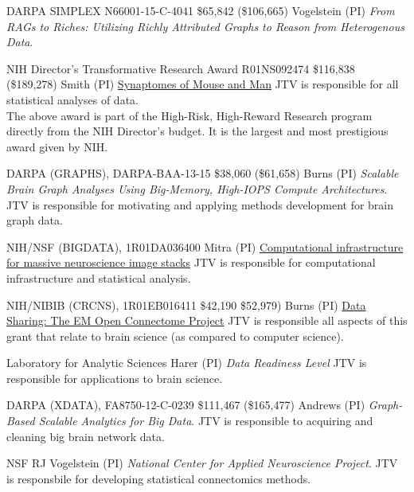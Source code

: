 \documentclass[10pt,colorlinks=true,urlcolor=blue]{moderncv}
\begin{document}
    {DARPA SIMPLEX N66001-15-C-4041}
    {\$65,842 (\$106,665)}
    {Vogelstein (PI)}
    {\emph{From RAGs to Riches: Utilizing Richly Attributed Graphs to Reason from Heterogenous Data}.}
    {}
    {}


    {NIH Director's Transformative Research Award R01NS092474}
    {\$116,838 (\$189,278)}
    {Smith (PI)}
    {\href{http://grantome.com/grant/NIH/R01-NS092474-01}%
    {Synaptomes of Mouse and Man}}
    {JTV is responsible for all statistical analyses of data.\\
    The above award is part of the High-Risk, High-Reward Research program directly from the NIH Director's budget.  It is the largest and most prestigious award given by NIH.}

    {DARPA (GRAPHS), DARPA-BAA-13-15}
    {\$38,060 (\$61,658)}
    {Burns (PI)}
    {\emph{Scalable Brain Graph Analyses Using Big-Memory, High-IOPS Compute Architectures}.}
    {JTV is responsible for motivating and applying methods development for brain graph data. }
    {}

    {NIH/NSF (BIGDATA), 1R01DA036400}
    {}
    {Mitra (PI)}
    {\href{https://www.nsf.gov/awardsearch/showAward?AWD_ID=1649865}%
    {Computational infrastructure for massive neuroscience image stacks}}
    {JTV is responsible for computational infrastructure and statistical analysis.}
    {}


    {NIH/NIBIB (CRCNS), 1R01EB016411}
    {\$42,190 \$52,979)}
    {Burns (PI)}
    {\href{http://grantome.com/grant/NIH/R01-EB016411-03}%
	{Data Sharing: The EM Open Connectome Project}}
    {JTV is responsible all aspects of this grant that relate to brain science (as compared to computer science).}
    {}

    {Laboratory for Analytic Sciences}{}
    {Harer (PI)}
    {\emph{Data Readiness Level}}
    {JTV is responsible for applications to brain science.}
    {}


    {DARPA (XDATA), FA8750-12-C-0239}
    {\$111,467 (\$165,477)}
    {Andrews (PI)}
    {\emph{Graph-Based Scalable Analytics for Big Data}.}
    {JTV is responsible to acquiring and cleaning big brain network data.}
    {}

    {NSF}{}
    {RJ Vogelstein (PI)}
    {\emph{National Center for Applied Neuroscience Project}.}
    {JTV is responsbile for developing statistical connectomics methods.}    
    {}
\end{document}
